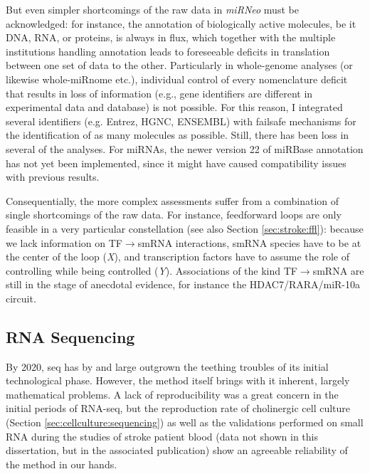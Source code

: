But even simpler shortcomings of the raw data in \emph{miRNeo} must be acknowledged: for instance, the annotation of biologically active molecules, be it DNA, RNA, or proteins, is always in flux, which together with the multiple institutions handling annotation leads to foreseeable deficits in translation between one set of data to the other. Particularly in whole-genome analyses (or likewise whole-miRnome etc.), individual control of every nomenclature deficit that results in loss of information (e.g., gene identifiers are different in experimental data and database) is not possible. For this reason, I integrated several identifiers (e.g. Entrez, HGNC, ENSEMBL) with failsafe mechanisms for the identification of as many molecules as possible. Still, there has been loss in several of the analyses. For miRNAs, the newer version 22 of miRBase annotation has not yet been implemented, since it might have caused compatibility issues with previous results.

Consequentially, the more complex assessments suffer from a combination of single shortcomings of the raw data. For instance, feedforward loops are only feasible in a very particular constellation (see also Section \ref{sec:stroke:ffl}): because we lack information on TF$\to$smRNA interactions, smRNA species have to be at the center of the loop (\emph{X}), and transcription factors have to assume the role of controlling while being controlled (\emph{Y}). Associations of the kind TF$\to$smRNA are still in the stage of anecdotal evidence, for instance the HDAC7/RARA/miR-10a circuit.\cite{Lee2017}

\subsection{RNA Sequencing} \label{sec:discussion:rna-seq}
By 2020, \ac{seq} has by and large outgrown the teething troubles of its initial technological phase. However, the method itself brings with it inherent, largely mathematical problems. A lack of reproducibility was a great concern in the initial periods of RNA-seq, but the reproduction rate of cholinergic cell culture (Section \ref{sec:cellculture:sequencing}) as well as the validations performed on small RNA during the studies of stroke patient blood (data not shown in this dissertation, but in the associated publication\cite{Winek2020}) show an agreeable reliability of the method in our hands.

